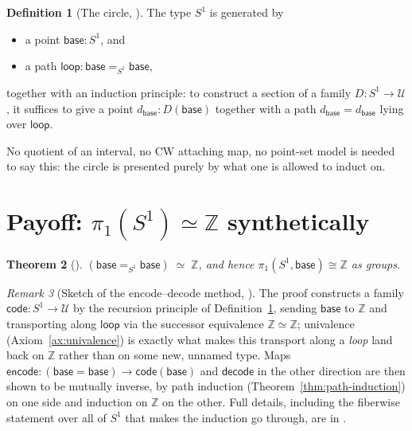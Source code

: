 \documentclass[11pt]{amsart}
\theoremstyle{plain}
\newtheorem{theorem}{Theorem}[section]
\theoremstyle{definition}
\newtheorem{definition}[theorem]{Definition}
\theoremstyle{remark}
\newtheorem{remark}[theorem]{Remark}
\newcommand{\ZZ}{\mathbb{Z}}
\newcommand{\Uni}{\mathcal{U}}
\newcommand{\Scirc}{S^1}
\begin{document}
\begin{definition}[The circle, {\cite[\S 6.3--6.4]{HoTTBook}}]\label{def:circle}
  The type $\Scirc$ is generated by
  \begin{itemize}[leftmargin=1.6em]
    \item a point $\mathsf{base}:\Scirc$, and
    \item a path $\mathsf{loop}:\mathsf{base}=_{\Scirc}\mathsf{base}$,
  \end{itemize}
  together with an induction principle: to construct a section of a
  family $D:\Scirc\to\Uni$, it suffices to give a point
  $d_{\mathsf{base}}:D(\mathsf{base})$ together with a path
  $d_{\mathsf{base}}=d_{\mathsf{base}}$ lying over $\mathsf{loop}$.
\end{definition}

No quotient of an interval, no CW attaching map, no point-set model is
needed to say this: the circle is presented purely by what one is
allowed to induct on.

\section{Payoff: \texorpdfstring{$\pi_1(\Scirc)\simeq\ZZ$}{pi\_1(S1) = Z} synthetically}\label{sec:payoff}

\begin{theorem}[{\cite[Thm.~8.1.1]{HoTTBook}}]\label{thm:pi1-circle}
  $(\mathsf{base}=_{\Scirc}\mathsf{base}) \;\simeq\; \ZZ$, and hence
  $\pi_1(\Scirc,\mathsf{base})\cong\ZZ$ as groups.
\end{theorem}

\begin{remark}[Sketch of the encode--decode method, {\cite[\S 8.1]{HoTTBook}}]\label{rmk:encode-decode}
  The proof constructs a family $\mathsf{code}:\Scirc\to\Uni$ by the
  recursion principle of Definition~\ref{def:circle}, sending $\mathsf{base}$ to
  $\ZZ$ and transporting along $\mathsf{loop}$ via the
  successor equivalence $\ZZ\simeq\ZZ$; univalence
  (Axiom~\ref{ax:univalence}) is exactly what makes this transport along a
  \emph{loop} land back on $\ZZ$ rather than on some new, unnamed type.
  Maps $\mathsf{encode}:(\mathsf{base}=\mathsf{base})\to\mathsf{code}(\mathsf{base})$
  and $\mathsf{decode}$ in the other direction are then shown to be
  mutually inverse, by path induction (Theorem~\ref{thm:path-induction}) on one
  side and induction on $\ZZ$ on the other. Full details, including the
  fiberwise statement over all of $\Scirc$ that makes the induction go
  through, are in \cite[\S 8.1]{HoTTBook}.
\end{remark}
\end{document}
